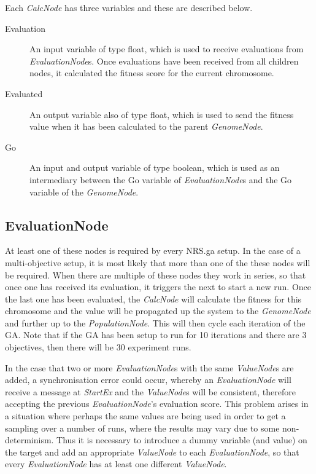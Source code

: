 \documentclass[10pt, notitlepage, a4paper]{article}
\begin{document}
\noindent Each {\it CalcNode} has three variables and these are described below.
\begin{description}
\item[Evaluation]An input variable of type float, which is used to receive evaluations from {\it EvaluationNode}s. Once evaluations have been received from all children nodes, it calculated the fitness score for the current chromosome.
\item[Evaluated]An output variable also of type float, which is used to send the fitness value when it has been calculated to the parent {\it GenomeNode}.
\item[Go]An input and output variable of type boolean, which is used as an intermediary between the Go variable of {\it EvaluationNode}s and the Go variable of the {\it GenomeNode}.
\end{description}

\subsection{EvaluationNode}
At least one of these nodes is required by every NRS.ga setup. In the case of a multi-objective setup, it is most likely that more than one of the these nodes will be required. When there are multiple of these nodes they work in series, so that once one has received its evaluation, it triggers the next to start a new run. Once the last one has been evaluated, the {\it CalcNode} will calculate the fitness for this chromosome and the value will be propagated up the system to the {\it GenomeNode} and further up to the {\it PopulationNode}. This will then cycle each iteration of the GA. Note that if the GA has been setup to run for 10 iterations and there are 3 objectives, then there will be 30 experiment runs.

In the case that two or more {\it EvaluationNode}s with the same {\it ValueNode}s are added, a synchronisation error could occur, whereby an {\it EvaluationNode} will receive a message at {\it StartEx} and the {\it ValueNode}s will be consistent, therefore accepting the previous {\it EvaluationNode}'s evaluation score. This problem arises in a situation where perhaps the same values are being used in order to get a sampling over a number of runs, where the results may vary due to some non-determinism. Thus it is necessary to introduce a dummy variable (and value) on the target and add an appropriate {\it ValueNode} to each {\it EvaluationNode}, so that every {\it EvaluationNode} has at least one different {\it ValueNode}.
\end{document}
